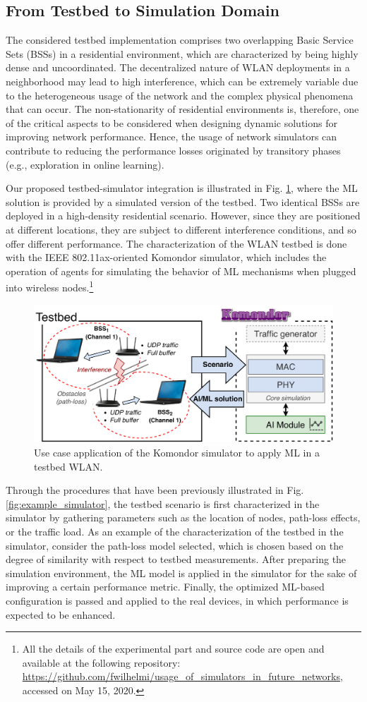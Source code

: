 \documentclass{article}
\begin{document}
	\subsection{From Testbed to Simulation Domain}
	The considered testbed implementation comprises two overlapping Basic Service Sets (BSSs) in a residential environment, which are characterized by being highly dense and uncoordinated. The decentralized nature of WLAN deployments in a neighborhood may lead to high interference, which can be extremely variable due to the heterogeneous usage of the network and the complex physical phenomena that can occur. The non-stationarity of residential environments is, therefore, one of the critical aspects to be considered when designing dynamic solutions for improving network performance. Hence, the usage of network simulators can contribute to reducing the performance losses originated by transitory phases (e.g., exploration in online learning). 

	Our proposed testbed-simulator integration is illustrated in Fig. \ref{fig:testbed}, where the ML solution is provided by a simulated version of the testbed. Two identical BSSs are deployed in a high-density residential scenario. However, since they are positioned at different locations, they are subject to different interference conditions, and so offer different performance. The characterization of the WLAN testbed is done with the IEEE 802.11ax-oriented Komondor simulator, which includes the operation of agents for simulating the behavior of ML mechanisms when plugged into wireless nodes.\footnote{All the details of the experimental part and source code are open and available at the following repository: \url{https://github.com/fwilhelmi/usage_of_simulators_in_future_networks}, accessed on May 15, 2020.}
		
	\begin{figure}[ht!]
		\centering
		\includegraphics[width=.6\columnwidth]{testbed2.pdf}
		\caption{Use case application of the Komondor simulator to apply ML in a testbed WLAN.}
		\label{fig:testbed}
	\end{figure}

	Through the procedures that have been previously illustrated in Fig. \ref{fig:example_simulator}, the testbed scenario is first characterized in the simulator by gathering parameters such as the location of nodes, path-loss effects, or the traffic load. As an example of the characterization of the testbed in the simulator, consider the path-loss model selected, which is chosen based on the degree of similarity with respect to testbed measurements. After preparing the simulation environment, the ML model is applied in the simulator for the sake of improving a certain performance metric. Finally, the optimized ML-based configuration is passed and applied to the real devices, in which performance is expected to be enhanced.
	
\end{document}
